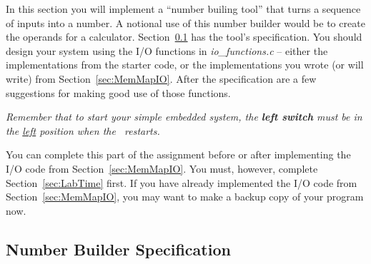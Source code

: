 In this section you will implement a ``number builing tool'' that turns a sequence of inputs into a number.
A notional use of this number builder would be to create the operands for a calculator.
Section~\ref{subsec:functionalspecification} has the tool's specification.
You should design your system using the I/O functions in \textit{io\_functions.c} -- either the implementations from the starter code, or the implementations you wrote (or will write) from Section~\ref{sec:MemMapIO}.
After the specification are a few suggestions for making good use of those functions.

\textit{Remember that to start your simple embedded system, the \textbf{left switch} must be in the \underline{left} position when the \developmentboard\ restarts.}

You can complete this part of the assignment before or after implementing the I/O code from Section~\ref{sec:MemMapIO}.
You must, however, complete Section~\ref{sec:LabTime} first.
If you have already implemented the I/O code from Section~\ref{sec:MemMapIO}, you may want to make a backup copy of your program now.


\subsection{Number Builder Specification} \label{subsec:functionalspecification}

